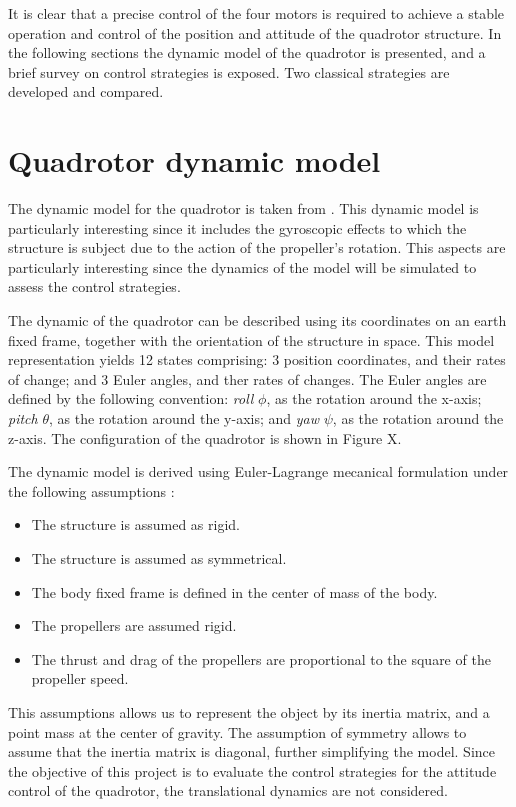 \documentclass[12pt]{article}
\begin{document}
It is clear that a precise control of the four motors is required to achieve a stable operation and control of the position and attitude of the quadrotor structure. In the following sections the dynamic model of the quadrotor is presented, and a brief survey on control strategies is exposed. Two classical strategies are developed and compared.

\section{Quadrotor dynamic model}
\label{sec:dynamics}
The dynamic model for the quadrotor is taken from \cite{Boua04}. This dynamic model is particularly interesting since it includes the gyroscopic effects to which the structure is subject due to the action of the propeller's rotation. This aspects are particularly interesting since the dynamics of the model will be simulated to assess the control strategies.

The dynamic of the quadrotor can be described using its coordinates on an earth fixed frame, together with the orientation of the structure in space. This model representation yields 12 states comprising: 3 position coordinates, and their rates of change; and 3 Euler angles, and ther rates of changes. The Euler angles are defined by the following convention: \emph{roll} $\phi$, as the rotation around the x-axis; \emph{pitch} $\theta$, as the rotation around the y-axis; and \emph{yaw} $\psi$, as the rotation around the z-axis. The configuration of the quadrotor is shown in Figure X.

The dynamic model is derived using Euler-Lagrange mecanical formulation under the following assumptions \cite{Boua04}:

\begin{itemize}
\item The structure is assumed as rigid.
\item The structure is assumed as symmetrical.
\item The body fixed frame is defined in the center of mass of the body.
\item The propellers are assumed rigid.
\item The thrust and drag of the propellers are proportional to the square of the propeller speed.
\end{itemize}

This assumptions allows us to represent the object by its inertia matrix, and a point mass at the center of gravity. The assumption of symmetry allows to assume that the inertia matrix is diagonal, further simplifying the model. Since the objective of this project is to evaluate the control strategies for the attitude control of the quadrotor, the translational dynamics are not considered. 
\end{document}
